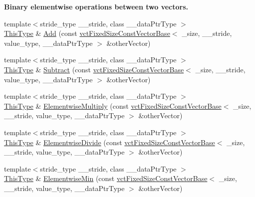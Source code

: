 \begin{Indent}{\bf Binary elementwise operations between two vectors.}
\begin{DoxyCompactItemize}
{\footnotesize template$<$stride\-\_\-type \-\_\-\-\_\-stride, class \-\_\-\-\_\-data\-Ptr\-Type $>$ }\\\hyperlink{classvct_fixed_size_const_vector_base_a071063bc4fa43112cc287b2dbef53180}{This\-Type} \& \hyperlink{classvct_fixed_size_vector_base_a802695215dba1acb0f0bdf29bc372c8d}{Add} (const \hyperlink{classvct_fixed_size_const_vector_base}{vct\-Fixed\-Size\-Const\-Vector\-Base}$<$ \-\_\-size, \-\_\-\-\_\-stride, value\-\_\-type, \-\_\-\-\_\-data\-Ptr\-Type $>$ \&other\-Vector)
\item 
{\footnotesize template$<$stride\-\_\-type \-\_\-\-\_\-stride, class \-\_\-\-\_\-data\-Ptr\-Type $>$ }\\\hyperlink{classvct_fixed_size_const_vector_base_a071063bc4fa43112cc287b2dbef53180}{This\-Type} \& \hyperlink{classvct_fixed_size_vector_base_af130d2812aec62e18f7d422ae48110ac}{Subtract} (const \hyperlink{classvct_fixed_size_const_vector_base}{vct\-Fixed\-Size\-Const\-Vector\-Base}$<$ \-\_\-size, \-\_\-\-\_\-stride, value\-\_\-type, \-\_\-\-\_\-data\-Ptr\-Type $>$ \&other\-Vector)
\item 
{\footnotesize template$<$stride\-\_\-type \-\_\-\-\_\-stride, class \-\_\-\-\_\-data\-Ptr\-Type $>$ }\\\hyperlink{classvct_fixed_size_const_vector_base_a071063bc4fa43112cc287b2dbef53180}{This\-Type} \& \hyperlink{classvct_fixed_size_vector_base_ad68ef93b9c3e1039589ee6a2a30106aa}{Elementwise\-Multiply} (const \hyperlink{classvct_fixed_size_const_vector_base}{vct\-Fixed\-Size\-Const\-Vector\-Base}$<$ \-\_\-size, \-\_\-\-\_\-stride, value\-\_\-type, \-\_\-\-\_\-data\-Ptr\-Type $>$ \&other\-Vector)
\item 
{\footnotesize template$<$stride\-\_\-type \-\_\-\-\_\-stride, class \-\_\-\-\_\-data\-Ptr\-Type $>$ }\\\hyperlink{classvct_fixed_size_const_vector_base_a071063bc4fa43112cc287b2dbef53180}{This\-Type} \& \hyperlink{classvct_fixed_size_vector_base_a0225335e76b1db401cc1e2b1375f046b}{Elementwise\-Divide} (const \hyperlink{classvct_fixed_size_const_vector_base}{vct\-Fixed\-Size\-Const\-Vector\-Base}$<$ \-\_\-size, \-\_\-\-\_\-stride, value\-\_\-type, \-\_\-\-\_\-data\-Ptr\-Type $>$ \&other\-Vector)
\item 
{\footnotesize template$<$stride\-\_\-type \-\_\-\-\_\-stride, class \-\_\-\-\_\-data\-Ptr\-Type $>$ }\\\hyperlink{classvct_fixed_size_const_vector_base_a071063bc4fa43112cc287b2dbef53180}{This\-Type} \& \hyperlink{classvct_fixed_size_vector_base_a856b0447ea1f83cf9a13c1ace5dff4fe}{Elementwise\-Min} (const \hyperlink{classvct_fixed_size_const_vector_base}{vct\-Fixed\-Size\-Const\-Vector\-Base}$<$ \-\_\-size, \-\_\-\-\_\-stride, value\-\_\-type, \-\_\-\-\_\-data\-Ptr\-Type $>$ \&other\-Vector)

\end{DoxyCompactItemize}
\end{Indent}
